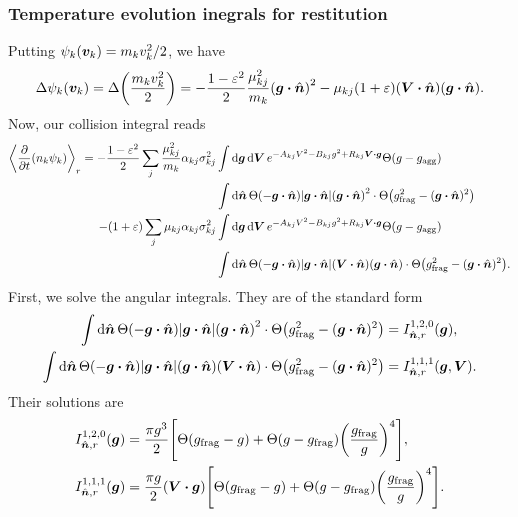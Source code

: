 \documentclass[aps,prl,preprint,groupedaddress,10pt]{revtex4-2}
\begin{document}
\subsubsection{Temperature evolution inegrals for restitution}
Putting $\psi_k(\vb*{v}_k)=m_kv_k^2/2$, we have
\begin{equation}
    \Delta\psi_k\pqty{\bv_k}=\Delta\pqty{\frac{m_kv_k^2}{2}}=
    -\frac{1-\eps^2}{2}\frac{\mu_{kj}^2}{m_k}\pqty{\bg\vdot\bn}^2
    -\mu_{kj}\pqty{1+\eps}\pqty{\bV\vdot\bn}\pqty{\bg\vdot\bn}.
\end{equation}
Now, our collision integral reads
\begin{equation}
    \begin{split}
        \avg{\pdv{t}(n_k\psi_k)}_r=-\frac{1-\eps^2}{2}\sum_{j}\frac{\mu_{kj}^2}{m_k}
        \alpha_{kj}\sigma_{kj}^2&\int
        \dd{\bg}\dd{\bV}e^{-A_{kj}V^2-B_{kj}g^2+R_{kj}\bV\vdot\bg}\Theta(g-\ltx{g}{agg})\\
        &\int\dd{\bn}\Theta\pqty{-\bg\vdot\bn}\abs{\bg\vdot\bn}
        \pqty{\bg\vdot\bn}^2\cdot\Theta\pqty{\ltx{g}{frag}^2-(\bg\vdot\bn)^2}\\
        -\pqty{1+\eps}\sum_{j}\mu_{kj}\alpha_{kj}\sigma_{kj}^2&\int
        \dd{\bg}\dd{\bV}e^{-A_{kj}V^2-B_{kj}g^2+R_{kj}\bV\vdot\bg}\Theta(g-\ltx{g}{agg})\\
        &\int\dd{\bn}\Theta\pqty{-\bg\vdot\bn}\abs{\bg\vdot\bn}
        \pqty{\bV\vdot\bn}\pqty{\bg\vdot\bn}\cdot
        \Theta\pqty{\ltx{g}{frag}^2-(\bg\vdot\bn)^2}.
    \end{split}
\end{equation}
First, we solve the angular integrals. They are of the standard form
\begin{equation}
    \begin{split}
        \int\dd{\bn}\Theta\pqty{-\bg\vdot\bn}\abs{\bg\vdot\bn}
        \pqty{\bg\vdot\bn}^2\cdot\Theta\pqty{\ltx{g}{frag}^2-(\bg\vdot\bn)^2}&=
        I^{1,2,0}_{\bn,r}(\bg),\\
        \int\dd{\bn}\Theta\pqty{-\bg\vdot\bn}\abs{\bg\vdot\bn}
        \pqty{\bg\vdot\bn}\pqty{\bV\vdot\bn}\cdot
        \Theta\pqty{\ltx{g}{frag}^2-(\bg\vdot\bn)^2}&=I^{1,1,1}_{\bn,r}\pqty{\bg,\bV}.
    \end{split}
\end{equation}
Their solutions are
\begin{equation}
    \begin{split}
        I^{1,2,0}_{\bn,r}(\bg)&=
        \frac{\pi g^{3}}{2}\bqty{\Theta\pqty{\ltx{g}{frag}-g}+
            \Theta\pqty{g-\ltx{g}{frag}}\pqty{\frac{\ltx{g}{frag}}{g}}^4},\\
        I^{1,1,1}_{\bn,r}(\bg)&=
        \frac{\pi g}{2}\pqty{\bV\vdot\bg}\bqty{\Theta\pqty{\ltx{g}{frag}-g}+
            \Theta\pqty{g-\ltx{g}{frag}}\pqty{\frac{\ltx{g}{frag}}{g}}^4}.
    \end{split}
\end{equation}
\end{document}
